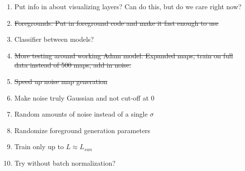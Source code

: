 \documentclass{article}
\begin{document}
\begin{enumerate}
			\item Put info in about visualizing layers?  Can do this, but do we care right now?

			\item \sout{Foregrounds.  Put in foreground code and make it fast enough to use}

			\item Classifier between models?

			\item \sout{More testing around working Adam model.  Expanded maps, train on full data instead of 500 maps, add in noise.}

			\item \sout{Speed up noise map generation}

			\item Make noise truly Gaussian and not cut-off at 0

			\item Random amounts of noise instead of a single \(\sigma\)

			\item Randomize foreground generation parameters

			\item Train only up to \(L \approx L_{sun}\)

			\item Try without batch normalization?
		\end{enumerate}


	
% 
\end{document}
